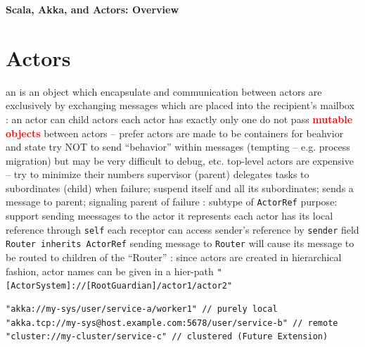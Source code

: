 \documentclass{note}
\begin{document}
\small


\begin{center}
 {\large\bf Scala, Akka, and Actors: Overview}
\end{center}

\vspace*{1cm}

\tableofcontents

\section{Actors}
\bit
\w an  is an object which encapsulate  and 
\w communication between actors are exclusively by exchanging messages which
are placed into the recipient's mailbox
\w {}:
   \bit
   \w an actor can  child actors
   \w each actor has exactly only one 
   \eit
\w {}
  \bit
  \w do not pass \textcolor{red}{\bf{}mutable objects} between actors --
  prefer 
  \w actors are made to be containers for beahvior and state
     \bit
     \w try NOT to send ``behavior'' within messages (tempting -- e.g. process
     migration) but may be very difficult to debug, etc.
     \eit
  \w top-level actors are expensive -- try to minimize their numbers
  \eit
\w {}
   \bit
   \w supervisor (parent) delegates tasks to subordinates (child)
   \w {}
      \bit
      \w when failure; suspend itself and all its subordinates; sends a
      message to parent; signaling parent of failure
      \eit
   \eit
\w {}: subtype of \verb+ActorRef+
  \bit
  \w purpose: support sending meessages to the actor it represents
  \w each actor has its local reference through \verb+self+
  \w each receptor can access sender's reference by \verb+sender+ field
  \w \verb+Router inherits ActorRef+
     \bit
     \w sending message to \verb+Router+ will cause its message to be routed
       to children of the ``Router''
     \eit
  \eit
\w {}:
    since actors are created in hierarchical fashion, actor names can be given
    in a hier-path
   \bit
   \w \verb+"[ActorSystem]://[RootGuardian]/actor1/actor2"+
\begin{verbatim}
"akka://my-sys/user/service-a/worker1" // purely local
"akka.tcp://my-sys@host.example.com:5678/user/service-b" // remote
"cluster://my-cluster/service-c" // clustered (Future Extension)
\end{verbatim}
   \eit
\end{document}
